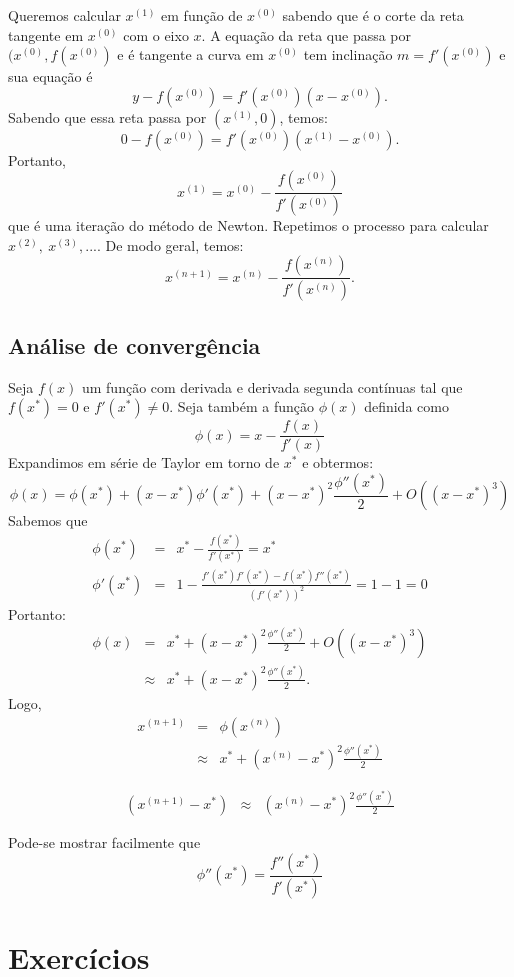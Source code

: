 \documentclass[main.tex]{subfiles}
\begin{document}
Queremos calcular $x^{(1)}$ em função de $x^{(0)}$ sabendo que é o corte da reta tangente em $x^{(0)}$ com o eixo $x$. A equação da reta que passa por $(x^{(0)}, f(x^{(0)})$ e é tangente a curva em $x^{(0)}$ tem inclinação $m=f'(x^{(0)})$ e sua equação é
$$
y-f(x^{(0)})=f'(x^{(0)})(x-x^{(0)}).
$$
Sabendo que essa reta passa por $(x^{(1)},0)$, temos:
$$
0-f(x^{(0)})=f'(x^{(0)})(x^{(1)}-x^{(0)}).
$$
Portanto,
$$x^{(1)}=x^{(0)}-\frac{f(x^{(0)})}{f'(x^{(0)})}$$
que é uma iteração do método de Newton. Repetimos o processo para calcular $x^{(2)},\ x^{(3)},...$. De modo geral, temos:
$$x^{(n+1)}=x^{(n)}-\frac{f(x^{(n)})}{f'(x^{(n)})}.$$

\subsection{Análise de convergência}

Seja $f(x)$ um função com derivada e derivada segunda contínuas tal que $f(x^*)=0$ e $f'(x^*)\neq 0$. Seja também a função $\phi(x)$ definida como
$$\phi(x)=x-\frac{f(x)}{f'(x)}$$
Expandimos em série de Taylor em torno de $x^*$ e obtermos:
$$\phi(x)=\phi(x^*)+(x-x^*)\phi'(x^*)+ (x-x^*)^2\frac{\phi''(x^*)}{2}+O\left((x-x^*)^3\right)$$
Sabemos que
\begin{eqnarray*}
\phi(x^*)&=&x^*-\frac{f(x^*)}{f'(x^*)}=x^*\\
\phi'(x^*)&=&1-\frac{f'(x^*)f'(x^*)-f(x^*)f''(x^*)}{\left(f'(x^*)\right)^2}=1-1=0
\end{eqnarray*}
Portanto:
\begin{eqnarray*}
\phi(x)&=&x^*+ (x-x^*)^2\frac{\phi''(x^*)}{2}+O\left((x-x^*)^3\right)\\
&\approx&x^*+ (x-x^*)^2\frac{\phi''(x^*)}{2}.
\end{eqnarray*}
Logo,
\begin{eqnarray*}
x^{(n+1)}&=&\phi(x^{(n)})\\
&\approx& x^*+ (x^{(n)}-x^*)^2\frac{\phi''(x^*)}{2}
\end{eqnarray*}

\begin{eqnarray*}
\left(x^{(n+1)}-x^*\right) &\approx& (x^{(n)}-x^*)^2\frac{\phi''(x^*)}{2}
\end{eqnarray*}

\begin{obs} Pode-se mostrar facilmente que
$$\phi''(x^*)=\frac{f''(x^*)}{f'(x^*)}$$
\end{obs}

\section*{Exercícios}
\end{document}

